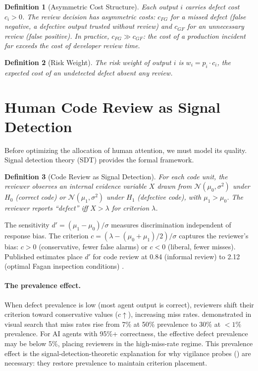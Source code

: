 \documentclass[11pt, a4paper, copyright]{googledeepmind}
\newtheorem{definition}{Definition}[section]
\begin{document}
\begin{definition}[Asymmetric Cost Structure]
\label{def:costs}
Each output $i$ carries defect cost $c_i > 0$. The review decision has asymmetric costs: $c_{FG}$ for a missed defect (false negative, a defective output trusted without review) and $c_{GF}$ for an unnecessary review (false positive). In practice, $c_{FG} \gg c_{GF}$: the cost of a production incident far exceeds the cost of developer review time.
\end{definition}

\begin{definition}[Risk Weight]
\label{def:risk-weight}
The risk weight of output $i$ is $w_i = p_i \cdot c_i$, the expected cost of an undetected defect absent any review.
\end{definition}

\section{Human Code Review as Signal Detection}
\label{sec:sdt}

Before optimizing the allocation of human attention, we must model its quality. Signal detection theory (SDT) \citep{green1966signal} provides the formal framework.

\begin{definition}[Code Review as Signal Detection]
\label{def:sdt}
For each code unit, the reviewer observes an internal evidence variable $X$ drawn from $\mathcal{N}(\mu_0, \sigma^2)$ under $H_0$ (correct code) or $\mathcal{N}(\mu_1, \sigma^2)$ under $H_1$ (defective code), with $\mu_1 > \mu_0$. The reviewer reports ``defect'' iff $X > \lambda$ for criterion $\lambda$.
\end{definition}

The sensitivity $d' = (\mu_1 - \mu_0)/\sigma$ measures discrimination independent of response bias. The criterion $c = (\lambda - (\mu_0 + \mu_1)/2)/\sigma$ captures the reviewer's bias: $c > 0$ (conservative, fewer false alarms) or $c < 0$ (liberal, fewer misses). Published estimates place $d'$ for code review at 0.84 (informal review) to 2.12 (optimal Fagan inspection conditions) \citep{fagan1976design, cohen2006best}.

\paragraph{The prevalence effect.} When defect prevalence is low (most agent output is correct), reviewers shift their criterion toward conservative values ($c \uparrow$), increasing miss rates. \citet{wolfe2005low} demonstrated in visual search that miss rates rise from 7\% at 50\% prevalence to 30\% at $<1\%$ prevalence. For AI agents with 95\%+ correctness, the effective defect prevalence may be below 5\%, placing reviewers in the high-miss-rate regime. This prevalence effect is the signal-detection-theoretic explanation for why vigilance probes () are necessary: they restore prevalence to maintain criterion placement.
\end{document}
